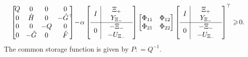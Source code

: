 \begin{equation}
    \begin{bmatrix}
        \! Q & \!0\! & \!0\! & 0 \!\!\! \\
        \! 0 & \!\hatH\! & \!0\! &-\hatG^\top \!\!\! \\
       \! 0 & \!0\! & \!-Q\! & 0 \!\!\! \\
       \! 0 & \!-\hatG\! & \!0\! & \hatF \!\!\!
        \end{bmatrix} \!-\! \alpha
        \left[\begin{array}{c|c}
            I & \begin{array}{c}
            \Xi_+\\Y_{\Xi_-} 
            \end{array}
            \\\hline
            0 & \begin{array}{c}
            -\Xi_-\\-U_{\Xi_-} 
            \end{array}
            \end{array}\right]
        \begin{bmatrix}
        \Phi_{11}  & \Phi_{12} \\ \Phi_{21} & \Phi_{22}
        \end{bmatrix}
        \left[\begin{array}{c|c}
            I & \begin{array}{c}
            \Xi_+\\Y_{\Xi_-} 
            \end{array}
            \\\hline
            0 & \begin{array}{c}
            -\Xi_-\\-U_{\Xi_-} 
            \end{array}
            \end{array}\right]^\top
        \geq\! 0. \label{ch5:eq:LMI3}
    \end{equation}
The common storage function is given by $P : = Q^{-1}$.
\ethe
